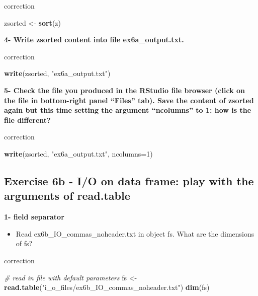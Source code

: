 \documentclass[]{book}
\newenvironment{Shaded}{\begin{snugshade}}{\end{snugshade}}
\newcommand{\CommentTok}[1]{\textcolor[rgb]{0.56,0.35,0.01}{\textit{#1}}}
\newcommand{\DataTypeTok}[1]{\textcolor[rgb]{0.13,0.29,0.53}{#1}}
\newcommand{\DecValTok}[1]{\textcolor[rgb]{0.00,0.00,0.81}{#1}}
\newcommand{\KeywordTok}[1]{\textcolor[rgb]{0.13,0.29,0.53}{\textbf{#1}}}
\newcommand{\NormalTok}[1]{#1}
\newcommand{\StringTok}[1]{\textcolor[rgb]{0.31,0.60,0.02}{#1}}
\providecommand{\tightlist}{%
  \setlength{\itemsep}{0pt}\setlength{\parskip}{0pt}}
\begin{document}
correction

\begin{Shaded}
\begin{Highlighting}[]
\NormalTok{zsorted <-}\StringTok{ }\KeywordTok{sort}\NormalTok{(z)}
\end{Highlighting}
\end{Shaded}

\textbf{4- Write zsorted content into file ex6a\_output.txt.}

correction

\begin{Shaded}
\begin{Highlighting}[]
\KeywordTok{write}\NormalTok{(zsorted, }\StringTok{"ex6a_output.txt"}\NormalTok{)}
\end{Highlighting}
\end{Shaded}

\textbf{5- Check the file you produced in the RStudio file browser (click on the file in bottom-right panel ``Files'' tab). Save the content of zsorted again but this time setting the argument ``ncolumns'' to 1: how is the file different?}

correction

\begin{Shaded}
\begin{Highlighting}[]
\KeywordTok{write}\NormalTok{(zsorted, }\StringTok{"ex6a_output.txt"}\NormalTok{, }\DataTypeTok{ncolumns=}\DecValTok{1}\NormalTok{)}
\end{Highlighting}
\end{Shaded}

\hypertarget{exercise-6b---io-on-data-frame-play-with-the-arguments-of-read.table}{%
\subsection{Exercise 6b - I/O on data frame: play with the arguments of read.table}\label{exercise-6b---io-on-data-frame-play-with-the-arguments-of-read.table}}

\textbf{1- field separator}

\begin{itemize}
\tightlist
\item
  Read ex6b\_IO\_commas\_noheader.txt in object fs.
  What are the dimensions of fs?
\end{itemize}

correction

\begin{Shaded}
\begin{Highlighting}[]
\CommentTok{# read in file with default parameters}
\NormalTok{fs <-}\StringTok{ }\KeywordTok{read.table}\NormalTok{(}\StringTok{"i_o_files/ex6b_IO_commas_noheader.txt"}\NormalTok{)}
\KeywordTok{dim}\NormalTok{(fs)}
\end{Highlighting}
\end{Shaded}
\end{document}
